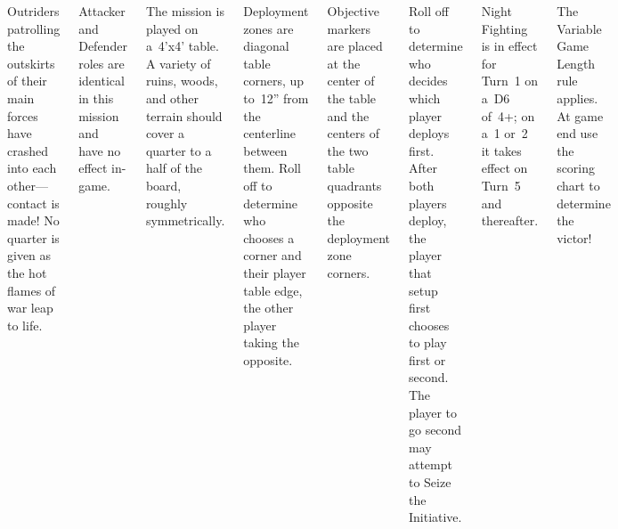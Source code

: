 \clearpage

\begin{columns}

\bigskip{}%

\smallskip\noindent Outriders patrolling the outskirts of their main
forces have crashed into each other---contact is made!  No quarter is
given as the hot flames of war leap to life.

 Attacker and Defender roles are
identical in this mission and have no effect in-game.

\bigskip{}%

\smallskip\noindent The mission is played on a~4'x4' table.  A variety
of ruins, woods, and other terrain should cover a quarter to a half of
the board, roughly symmetrically.

Deployment zones are diagonal table corners, up to~12'' from the
centerline between them.  Roll off to determine who chooses a corner
and their player table edge, the other player taking the opposite.

Objective markers are placed at the center of the table and the
centers of the two table quadrants opposite the deployment zone
corners.

\bigskip{}%

Roll off to determine who decides which player deploys first.  After
both players deploy, the player that setup first chooses to play first
or second.  The player to go second may attempt to Seize the
Initiative.

Night Fighting is in effect for Turn~1 on a~D6 of~4+; on a~1 or~2 it
takes effect on Turn~5 and thereafter.

The Variable Game Length rule applies.  At game end use the scoring
chart to determine the victor!


\columnbreak


\end{columns}
